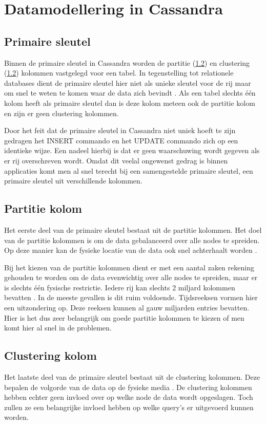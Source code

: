 \chapter{Datamodellering in Cassandra}
\label{ch:cassandra_modelling}
\section{Primaire sleutel}
Binnen de primaire sleutel in Cassandra worden de partitie (\ref{partition_key}) en clustering (\ref{partition_key}) kolommen vastgelegd voor een tabel.
In tegenstelling tot relationele databases dient de primaire sleutel hier niet als unieke sleutel voor de rij maar om snel te weten te komen waar de data zich bevindt \citep{kan2014cassandra}.
Als een tabel slechts één kolom heeft als primaire sleutel dan is deze kolom meteen ook de partitie kolom en zijn er geen clustering kolommen.

Door het feit dat de primaire sleutel in Cassandra niet uniek hoeft te zijn gedragen het INSERT commando en het UPDATE commando zich op een identieke wijze.
Een nadeel hierbij is dat er geen waarschuwing wordt gegeven als er rij overschreven wordt.
Omdat dit veelal ongewenst gedrag is binnen applicaties komt men al snel terecht bij een samengestelde primaire sleutel, een primaire sleutel uit verschillende kolommen.

\section{Partitie kolom}
\label{partition_key}
Het eerste deel van de primaire sleutel bestaat uit de partitie kolommen.
Het doel van de partitie kolommen is om de data gebalanceerd over alle nodes te spreiden.
Op deze manier kan de fysieke locatie van de data ook snel achterhaalt worden \citep{kan2014cassandra}.

Bij het kiezen van de partitie kolommen dient er met een aantal zaken rekening gehouden te worden om de data evenwichtig over alle nodes te spreiden, maar er is slechts één fysische restrictie.
Iedere rij kan slechts 2 miljard kolommen bevatten \citep{McFadin2013Timeseries}.
In de meeste gevallen is dit ruim voldoende.
Tijdsreeksen vormen hier een uitzondering op.
Deze reeksen kunnen al gauw miljarden entries bevatten.
Hier is het dus zeer belangrijk om  goede partitie kolommen te kiezen of men komt hier al snel in de problemen.

\section{Clustering kolom}
\label{clustering_key}
Het laatste deel van de primaire sleutel bestaat uit de clustering kolommen.
Deze bepalen de volgorde van de data op de fysieke media \citep{strickland2014availability}.
De clustering kolommen hebben echter geen invloed over op welke node de data wordt opgeslagen.
Toch zullen ze een belangrijke invloed hebben op welke query's er uitgevoerd kunnen worden.

